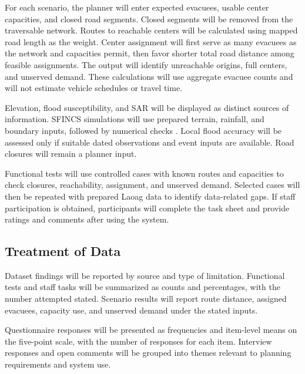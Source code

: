 For each scenario, the planner will enter expected evacuees, usable center capacities, and closed road segments. Closed segments will be removed from the traversable network. Routes to reachable centers will be calculated using mapped road length as the weight. Center assignment will first serve as many evacuees as the network and capacities permit, then favor shorter total road distance among feasible assignments. The output will identify unreachable origins, full centers, and unserved demand. These calculations will use aggregate evacuee counts and will not estimate vehicle schedules or travel time.

Elevation, flood susceptibility, and SAR will be displayed as distinct sources of information. SFINCS simulations will use prepared terrain, rainfall, and boundary inputs, followed by numerical checks \cite{sfincsinput,sfincsdocs,sfincsoutput}. Local flood accuracy will be assessed only if suitable dated observations and event inputs are available. Road closures will remain a planner input.

Functional tests will use controlled cases with known routes and capacities to check closures, reachability, assignment, and unserved demand. Selected cases will then be repeated with prepared Laoag data to identify data-related gaps. If staff participation is obtained, participants will complete the task sheet and provide ratings and comments after using the system.

\subsection{Treatment of Data}

Dataset findings will be reported by source and type of limitation. Functional tests and staff tasks will be summarized as counts and percentages, with the number attempted stated. Scenario results will report route distance, assigned evacuees, capacity use, and unserved demand under the stated inputs.

Questionnaire responses will be presented as frequencies and item-level means on the five-point scale, with the number of responses for each item. Interview responses and open comments will be grouped into themes relevant to planning requirements and system use.
